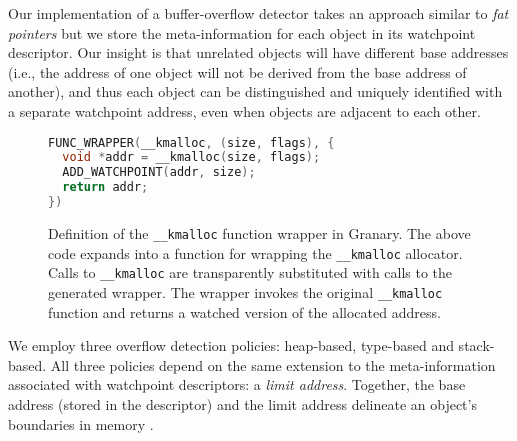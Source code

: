 Our implementation of a buffer-overflow detector takes an approach similar to \emph{fat pointers} but we store the meta-information for each object in its watchpoint descriptor. Our insight is that unrelated objects will have different base addresses (i.e., the address of one object will not be derived from the base address of another), and thus each object can be distinguished and uniquely identified with a separate watchpoint address, even when objects are adjacent to each other.


\begin{figure}
\begin{lstlisting}[language=C,basicstyle=\footnotesize\ttfamily]
FUNC_WRAPPER(__kmalloc, (size, flags), {
  void *addr = __kmalloc(size, flags);
  ADD_WATCHPOINT(addr, size);
  return addr;
})
\end{lstlisting}
\vspace{-10pt}
\caption[Function wrapper for kernel memory allocator.]{\label{fig:kmalloc_wrapper}Definition of the \texttt{\_\_kmalloc} function wrapper in Granary. The above code expands into a function for wrapping the \texttt{\_\_kmalloc} allocator. Calls to \texttt{\_\_kmalloc} are transparently substituted with calls to the generated wrapper. The wrapper invokes the original \texttt{\_\_kmalloc} function and returns a watched version of the allocated address.}
\end{figure}

We employ three overflow detection policies: heap-based, type-based and stack-based. All three policies depend on the same extension to the meta-information associated with watchpoint descriptors: a \emph{limit address}. Together, the base address (stored in the descriptor) and the limit address delineate an object's boundaries in memory \cite{BccFatPointers}.


